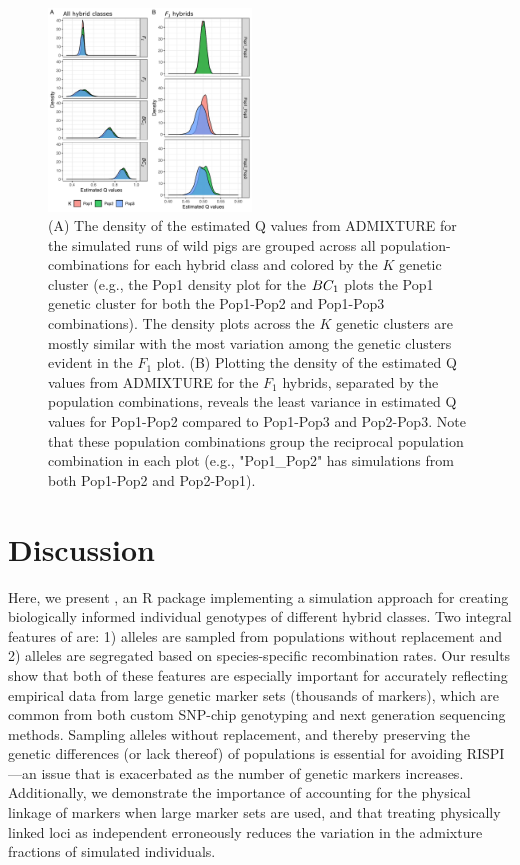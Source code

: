 {%
\begin{figure}
\newcommand{\pigsimsqscap}{\footnotesize (A) The density of the estimated Q values from ADMIXTURE for
the simulated runs of wild pigs are
grouped across all population-combinations for each hybrid class and colored by the $K$ genetic cluster
(e.g., the Pop1 density plot for the $\BC_1$ plots the Pop1 genetic cluster for both
the Pop1-Pop2 and Pop1-Pop3 combinations). The density plots across the $K$
genetic clusters are mostly similar with the most variation among the genetic clusters evident in
the $F_1$ plot. (B) Plotting the density of the estimated Q values from ADMIXTURE for the $F_1$ hybrids,
separated by the population combinations, reveals the least variance in estimated Q values for
Pop1-Pop2 compared to Pop1-Pop3 and Pop2-Pop3. Note that these population combinations group the
reciprocal population combination in each plot (e.g., "Pop1\_Pop2" has simulations
from both Pop1-Pop2 and Pop2-Pop1).}
\includegraphics[width=0.48\textwidth]{figures/simulation-density-multipanel.pdf}
\caption[\pigsimsqscap]{\pigsimsqscap}
\label{fig:pig-sim-qs}
\end{figure}

\section*{Discussion}

Here, we present \gscramble{}, an R package implementing a simulation
approach for creating biologically informed individual 
genotypes of different hybrid classes. Two integral features of \gscramble{} are: 
1) alleles are sampled from populations without replacement and 
2) alleles are segregated based on species-specific recombination rates. 
Our results show that both 
of these features are especially important for accurately reflecting empirical data from large genetic 
marker sets (thousands of markers), 
which are common from both custom SNP-chip genotyping and next generation sequencing methods. Sampling alleles without 
replacement, and thereby preserving the genetic differences (or lack thereof) of populations is 
essential for avoiding RISPI---an issue that is exacerbated as the number of 
genetic markers increases. Additionally, we demonstrate the importance of accounting for 
the physical linkage of markers when large marker sets are used, and that treating physically linked loci as 
independent erroneously reduces the variation in the admixture 
fractions of simulated individuals.

}
